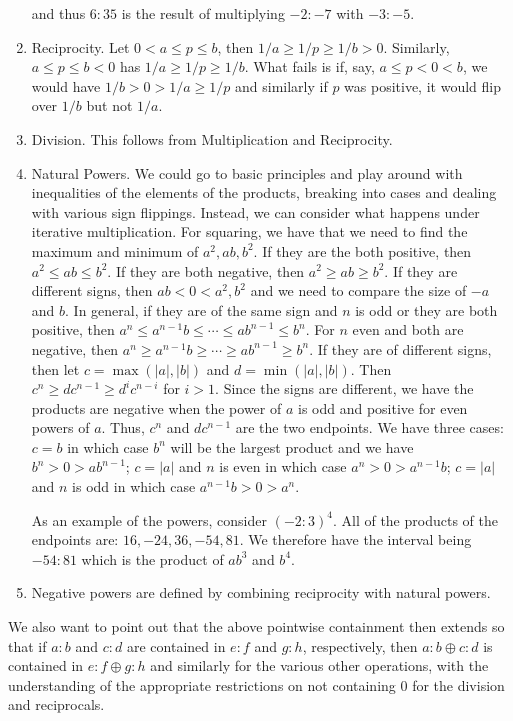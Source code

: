 \documentclass[12pt]{article}
\theoremstyle{remark}
\begin{document}
\begin{enumerate}
    and thus $6:35$ is the result of multiplying $-2:-7$ with $-3:-5$.
    
    \item Reciprocity. Let $0 < a \leq p \leq b$, then $1/a \geq 1/p  \geq 1/b > 0$. Similarly, $a \leq p \leq b< 0$ has $1/a \geq 1/p \geq 1/b$. What fails is if, say,  $a \leq p < 0 < b$, we would have $1/b > 0 > 1/a \geq 1/p $ and similarly if $p$ was positive, it would flip over $1/b$ but not $1/a$.
    \item Division. This follows from Multiplication and Reciprocity. 
    \item\label{natpow} Natural Powers. We could go to basic principles and play around with inequalities of the elements of the products, breaking into cases and dealing with various sign flippings. Instead, we can consider what happens under iterative multiplication. For squaring, we have that we need to find the maximum and minimum of $a^2, ab, b^2$. If they are the both positive, then $a^2 \leq ab \leq b^2$. If they are both negative, then $a ^2 \geq ab \geq b^2$. If they are different signs, then $ab < 0 < a^2, b^2$ and we need to compare the size of $-a$ and $b$.  In general, if they are of the same sign and $n$ is odd or they are both positive, then $a^n \leq a^{n-1} b \leq \cdots \leq ab^{n-1} \leq b^n$. For $n$ even and both are negative, then $a^n \geq a^{n-1} b \geq \cdots \geq ab^{n-1} \geq b^n$. If they are of different signs, then let $c = \max( |a|, |b|)$ and $d=\min(|a|, |b|)$. Then  $c^n \geq d c^{n-1} \geq d^{i}c^{n-i}$  for $i > 1$.  Since the signs are different, we have the products are negative when the power of $a$ is odd and positive for even powers of $a$. Thus, $c^n$ and $d c^{n-1}$ are the two endpoints. We have three cases: $c=b$ in which case $b^n$ will be the largest product and we have $b^n > 0 > ab^{n-1}$; $c=|a|$ and $n$ is even in which case $a^n > 0 > a^{n-1} b$; $c=|a|$ and $n$ is odd in which case $a^{n-1} b > 0 > a^n$.  

    As an example of the powers, consider $(-2:3)^4$. All of the products of the endpoints are: $16, -24, 36, -54, 81$. We therefore have the interval being $-54:81$ which is the product of $ab^3$ and $b^4$. 
     
    \item Negative powers are defined by combining reciprocity with natural powers. 
\end{enumerate}


We also want to point out that the above pointwise containment then extends so that if $a:b$ and $c:d$ are contained in $e:f$ and $g:h$, respectively, then $a:b \oplus c:d $ is contained in $e:f \oplus g:h$ and similarly for the various other operations, with the understanding of the appropriate restrictions on not containing 0 for the division and reciprocals. 
\end{document}
